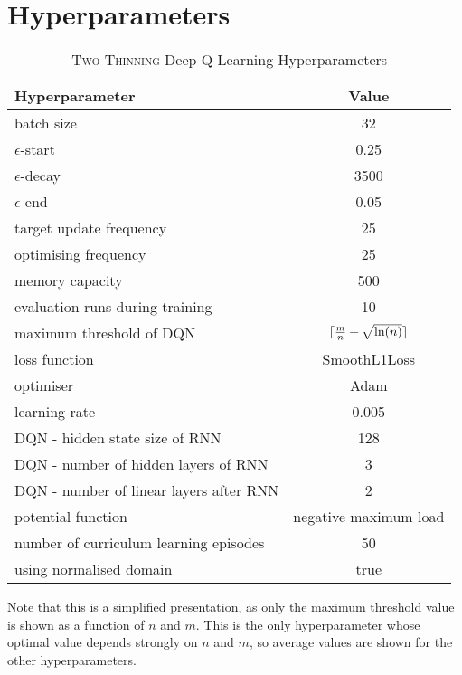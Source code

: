 
\chapter{Hyperparameters}\label{hyperparameters} 



\begin{table}[h!]\label{tab:two-thinning-hyperparameters}
\begin{threeparttable}
\caption{\textsc{Two-Thinning} Deep Q-Learning Hyperparameters}
\centering
\begin{tabular}{l|c}
\toprule
Hyperparameter             &     Value \\
\midrule
batch size               &     32 \\ 
$\epsilon$-start               &    0.25 \\ 
$\epsilon$-decay         &     3500\\
$\epsilon$-end              &     0.05 \\
target update frequency               &     25 \\ 
optimising frequency          &     25 \\ 
memory capacity     &     500 \\
evaluation runs during training             &     10 \\
maximum threshold of DQN             &     $\lceil\frac{m}{n}+\sqrt{\ln(n)}\rceil$ \\ 
loss function               &     SmoothL1Loss \\ 
optimiser        &     Adam \\
learning rate             &     0.005 \\
DQN - hidden state size of RNN               &     128 \\ 
DQN - number of hidden layers of RNN         &     3 \\ 
DQN - number of linear layers after RNN     &     2 \\
potential function            &    negative maximum load \\
number of curriculum learning episodes            & 50 \\ 
using normalised domain               &     true \\ 
\bottomrule
\end{tabular}
\begin{tablenotes}
      \small
      \item Note that this is a simplified presentation, as only the maximum threshold value is shown as a function of $n$ and $m$. This is the only hyperparameter whose optimal value depends strongly on $n$ and $m$, so average values are shown for the other hyperparameters.
\end{tablenotes}
\end{threeparttable}
\end{table}





